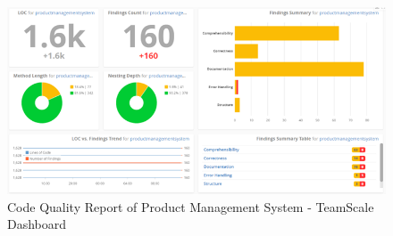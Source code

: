 \documentclass[letterpaper, 11pt]{report}
\begin{document}
\begin{figure}[htb]
\begin{center}
\includegraphics[width=13cm]{D1-Reengineering Opportunity/images/Picture4.png}
\caption{Code Quality Report of Product Management System - TeamScale Dashboard}
\end{center}
\end{figure}
\pagebreak
{}
\end{document}
